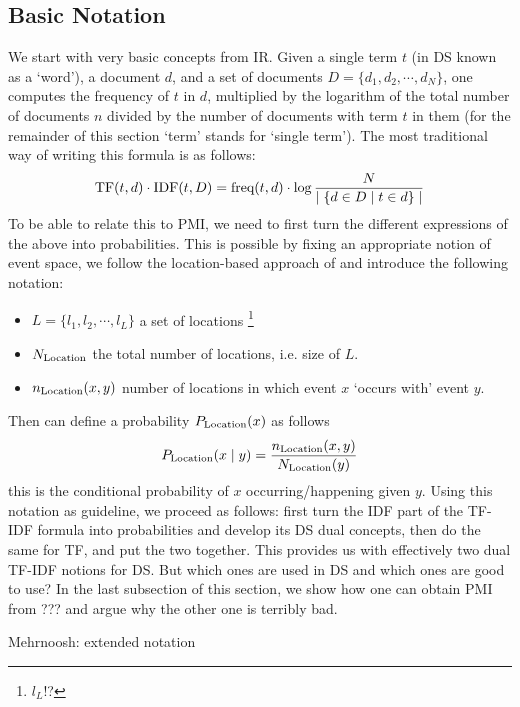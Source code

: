 \subsection{Basic Notation}
We start with very basic concepts from IR.  Given a  single term $t$ (in DS known as a `word'),  a document $d$, and a set of documents $D = \{d_1, d_2, \cdots, d_N\}$,  one computes  the frequency  of   $t$  in $d$, multiplied by  the logarithm of the  total number of documents $n$ divided by the number of documents with  term $t$ in them (for the remainder of this section `term' stands for `single term'). The most traditional way of writing this formula is as  follows:
\begin{equation}
\label{tf-idf}
\textmd{TF}(t,d) \cdot \textmd{IDF}(t, D) =
	\textmd{freq}(t, d) \cdot
	\log{{N} \over {\mid \{d \in D \mid t \in d\}\mid}}
\end{equation}
To be able to relate this to PMI, we need to first turn the different expressions of the above into probabilities.
This is possible by fixing an appropriate notion of event space, we follow the location-based approach of \cite{Roelleke:Book:2013} and introduce the following notation:
\begin{itemize}
\item $L = \{l_1, l_2, \cdots, l_L\}$ a set of locations
	\footnote{$l_L$!?}
\item $N_{\textmd{Location}}$ the total number of locations, i.e. size of $L$.
\item $n_{\textmd{Location}}(x,y)$ number of locations in which event $x$ `occurs with' event $y$.
\end{itemize}

Then can define a probability $P_{\textmd{Location}}(x)$ as follows
\[
P_{\textmd{Location}}(x \mid y) = \frac{n_{\textmd{Location}}(x,y)}{N_{\textmd{Location}}(y)}
\]
 this is the conditional probability of $x$ occurring/happening given $y$.
%
Using this notation as guideline, we proceed as follows:   first turn the IDF part of the TF-IDF formula into probabilities and develop its DS dual concepts, then do the same for TF, and  put the two together.  This provides us with effectively two dual TF-IDF notions for DS.  But which ones are used in DS and which ones are good to use? In the last subsection of this section, we show how one can obtain PMI from ??? and argue why the other  one is terribly bad. 


\hrulefill Mehrnoosh: extended notation

